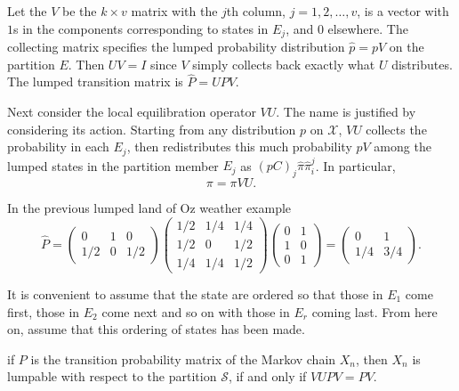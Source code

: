 \documentclass[12pt]{article}
\begin{document}
Let the %
\( V \) be the \( k \times v \) matrix with the \( j \)th column, \( j =
1, 2, \dots, v \), is a vector with \( 1 \)s in the components
corresponding to states in \( E_j \), and \( 0 \) elsewhere.  The
collecting matrix specifies the lumped probability distribution \( \hat{p}
= p V \) on the partition \( E \).  Then \( UV = I \) since \( V \)
simply collects back exactly what \( U \) distributes.  The lumped
transition matrix is \( \hat{P} = UPV \).

Next consider the local equilibration operator \( VU \).  The name is
justified by considering its action.  Starting from any distribution \(
p \) on \( \mathcal{X} \), \( VU \) collects the probability in each \(
E_j \), then redistributes this much probability \( pV \) among the
lumped states in the partition member \( E_j \) as \( (pC)_j \hat{\pi}
\hat{\pi}_i^j \).  In particular,
\[
    \pi = \pi VU.
\]

\begin{example}
    In the previous lumped land of Oz weather example
    \[
        \hat{P} =
        \begin{pmatrix}
            0 & 1 & 0 \\
            1/2 & 0 & 1/2
        \end{pmatrix}
        \begin{pmatrix}
            1/2 & 1/4 & 1/4 \\
            1/2 & 0 & 1/2 \\
            1/4 & 1/4 & 1/2
        \end{pmatrix}
        \begin{pmatrix}
            0 & 1 \\
            1 & 0 \\
            0 & 1
        \end{pmatrix}
        =
        \begin{pmatrix}
            0 & 1 \\
            1/4 & 3/4
        \end{pmatrix}
        .
    \]
\end{example}

It is convenient to assume that the state are ordered so that those in \(
E_1 \) come first, those in \( E_{2} \) come next and so on with those
in \( E_r \) coming last.  From here on, assume that this ordering of
states has been made.

\begin{theorem}
    if \( P \) is the transition probability matrix of the Markov chain \(
    X_n \), then \( X_n \) is lumpable with respect to the partition \(
    \mathcal{S} \), if and only if \( VUPV = PV \).
\end{theorem}
\end{document}
